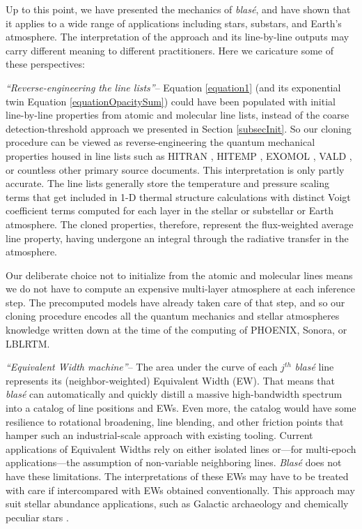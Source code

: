 \documentclass[twocolumn]{aastex631}
\begin{document}
Up to this point, we have presented the mechanics of  \emph{blas\'e}, and have shown that it applies to a wide range of applications including stars, substars, and Earth's atmosphere. The interpretation of the approach and its line-by-line outputs may carry different meaning to different practitioners.  Here we caricature some of these perspectives:


\emph{``Reverse-engineering the line lists''}-- Equation \ref{equation1} (and its exponential twin Equation \ref{equationOpacitySum}) could have been populated with initial line-by-line properties from atomic and molecular line lists, instead of the coarse detection-threshold approach we presented in Section \ref{subsecInit}.  So our cloning procedure can be viewed as reverse-engineering the quantum mechanical properties housed in line lists such as HITRAN \citep{2022JQSRT.27707949G}, HITEMP \citep{2010JQSRT.111.2139R}, EXOMOL \citep{2012MNRAS.425...21T}, VALD \citep{1995A&AS..112..525P}, or countless other primary source documents.  This interpretation is only partly accurate.  The line lists generally store the temperature and pressure scaling terms that get included in 1-D thermal structure calculations with distinct Voigt coefficient terms computed for each layer in the stellar or substellar or Earth atmosphere.  The cloned properties, therefore, represent the flux-weighted average line property, having undergone an integral through the radiative transfer in the atmosphere.

Our deliberate choice not to initialize from the atomic and molecular lines means we do not have to compute an expensive multi-layer atmosphere at each inference step.  The precomputed models have already taken care of that step, and so our cloning procedure encodes all the quantum mechanics and stellar atmospheres knowledge written down at the time of the computing of PHOENIX, Sonora, or LBLRTM.


\emph{``Equivalent Width machine''}-- The area under the curve of each $j^{th}$  \emph{blas\'e} line represents its (neighbor-weighted) Equivalent Width (EW).  That means that  \emph{blas\'e} can automatically and quickly distill a massive high-bandwidth spectrum into a catalog of line positions and EWs.  Even more, the catalog would have some resilience to rotational broadening, line blending, and other friction points that hamper such an industrial-scale approach with existing tooling.  Current applications of Equivalent Widths rely on either isolated lines or---for multi-epoch applications---the assumption of non-variable neighboring lines.   \emph{Blas\'e} does not have these limitations.  The interpretations of these EWs may have to be treated with care if intercompared with EWs obtained conventionally.  This approach may suit stellar abundance applications, such as Galactic archaeology and chemically peculiar stars \citep[\emph{e.g. HgMn stars,}][]{2020MNRAS.496..832C}.
\end{document}
